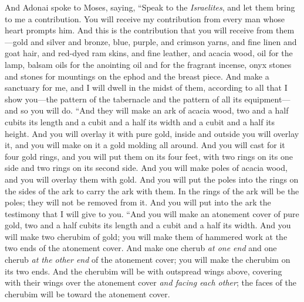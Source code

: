 \begin{biblechapter} %
 And Adonai spoke to Moses, saying,
\verse “Speak to the \textit{Israelites}, and let them bring to me a contribution. You will receive my contribution from every man whose heart prompts him.
\verse And this is the contribution that you will receive from them—gold and silver and bronze,
\verse blue, purple, and crimson yarns, and fine linen and goat hair,
\verse and red-dyed ram skins, and fine leather, and acacia wood,
\verse oil for the lamp, balsam oils for the anointing oil and for the fragrant incense,
\verse onyx stones and stones for mountings on the ephod and the breast piece.
\verse And make a sanctuary for me, and I will dwell in the midst of them,
\verse according to all that I show you—the pattern of the tabernacle and the pattern of all its equipment—and so you will do.
 “And they will make an ark of acacia wood, two and a half cubits its length and a cubit and a half its width and a cubit and a half its height.
\verse And you will overlay it with pure gold, inside and outside you will overlay it, and you will make on it a gold molding all around.
\verse And you will cast for it four gold rings, and you will put them on its four feet, with two rings on its one side and two rings on its second side.
\verse And you will make poles of acacia wood, and you will overlay them with gold.
\verse And you will put the poles into the rings on the sides of the ark to carry the ark with them.
\verse In the rings of the ark will be the poles; they will not be removed from it.
\verse And you will put into the ark the testimony that I will give to you.
\verse “And you will make an atonement cover of pure gold, two and a half cubits its length and a cubit and a half its width.
\verse And you will make two cherubim of gold; you will make them of hammered work at the two ends of the atonement cover.
\verse And make one cherub \textit{at one end} and one cherub \textit{at the other end} of the atonement cover; you will make the cherubim on its two ends.
\verse And the cherubim will be with outspread wings above, covering with their wings over the atonement cover \textit{and facing each other}; the faces of the cherubim will be toward the atonement cover.

\end{biblechapter}
